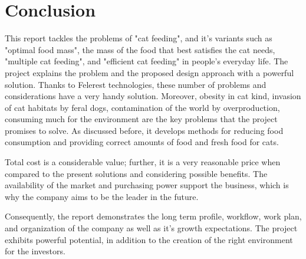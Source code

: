 \section{Conclusion}
\label{sec:conclusion}

This report tackles the problems of "cat feeding", and  it's variants such as "optimal food mass", the mass of the food that best satisfies the cat needs, "multiple cat feeding", and "efficient cat feeding" in people's everyday life.
The project explains the problem and the proposed design approach with a powerful solution. Thanks to Felerest technologies, these number of problems and considerations have a very handy solution. Moreover, obesity in cat kind, invasion of cat habitats by feral dogs, contamination of the world by overproduction, consuming much for the environment are the key problems that the project promises to solve. As discussed before, it develops methods for reducing food consumption and providing correct amounts of food and fresh food for cats.

Total cost is a considerable value; further, it is a very reasonable price when compared to the present solutions and considering possible benefits. The availability of the market and purchasing power support the business, which is why the company aims to be the leader in the future.

Consequently, the report demonstrates the long term profile, workflow, work plan, and organization of the company as well as it's growth expectations. The project exhibits powerful potential, in addition to the creation of the right environment for the investors.

